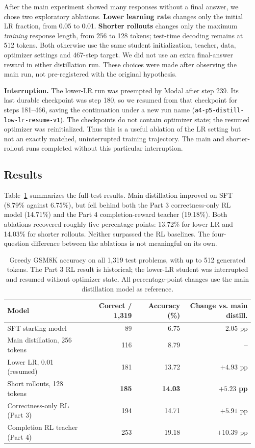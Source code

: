 \documentclass[10pt]{article}
\newcommand{\code}[1]{\texttt{#1}}
\begin{document}
After the main experiment showed many responses without a final answer, we chose two exploratory ablations. \textbf{Lower learning rate} changes only the initial LR fraction, from 0.05 to 0.01. \textbf{Shorter rollouts} changes only the maximum \emph{training} response length, from 256 to 128 tokens; test-time decoding remains at 512 tokens. Both otherwise use the same student initialization, teacher, data, optimizer settings and 467-step target. We did not use an extra final-answer reward in either distillation run. These choices were made after observing the main run, not pre-registered with the original hypothesis.

\textbf{Interruption.} The lower-LR run was preempted by Modal after step 239. Its last durable checkpoint was step 180, so we resumed from that checkpoint for steps 181--466, saving the continuation under a new run name (\code{a4-p5-distill-low-lr-resume-v1}). The checkpoints do not contain optimizer state; the resumed optimizer was reinitialized. Thus this is a useful ablation of the LR setting but not an exactly matched, uninterrupted training trajectory. The main and shorter-rollout runs completed without this particular interruption.

\subsection*{Results}
Table~\ref{tab:p5} summarizes the full-test results. Main distillation improved on SFT (8.79\% against 6.75\%), but fell behind both the Part 3 correctness-only RL model (14.71\%) and the Part 4 completion-reward teacher (19.18\%). Both ablations recovered roughly five percentage points: 13.72\% for lower LR and 14.03\% for shorter rollouts. Neither surpassed the RL baselines. The four-question difference between the ablations is not meaningful on its own.

\begin{table}[h]
\centering
\small
\begin{tabular}{lrrr}
\toprule
Model & Correct / 1{,}319 & Accuracy (\%) & Change vs. main distill. \\
\midrule
SFT starting model & 89 & 6.75 & $-2.05$ pp \\
Main distillation, 256 tokens & 116 & 8.79 & -- \\
Lower LR, 0.01 (resumed) & 181 & 13.72 & $+4.93$ pp \\
Short rollouts, 128 tokens & \textbf{185} & \textbf{14.03} & \textbf{$+5.23$ pp} \\
Correctness-only RL (Part 3) & 194 & 14.71 & $+5.91$ pp \\
Completion RL teacher (Part 4) & 253 & 19.18 & $+10.39$ pp \\
\bottomrule
\end{tabular}
\caption{Greedy GSM8K accuracy on all 1{,}319 test problems, with up to 512 generated tokens. The Part 3 RL result is historical; the lower-LR student was interrupted and resumed without optimizer state. All percentage-point changes use the main distillation model as reference.}
\label{tab:p5}
\end{table}
\end{document}
